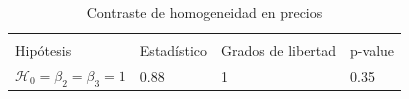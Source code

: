 \documentclass[12pt, twoside]{book}\usepackage[]{graphicx}\usepackage[]{color}
\numberwithin{equation}{section}
\numberwithin{theorem}{section}
\numberwithin{teorema}{section}
\numberwithin{defi}{section}
\numberwithin{prop}{section}
\numberwithin{defi}{section}
\theoremstyle{plain}
\begin{document}
\begin{table}[!htpb]
\centering
\begin{threeparttable}
\caption{Contraste de homogeneidad en precios \label{blrtest}}
\begin{tabular}{@{}llll@{}}
\toprule \\
Hipótesis & Estadístico & Grados de libertad & p-value \\
\midrule 
$\mathcal{H}_{0}=\beta_{2}=\beta_{3}=1$ & 0.88 & 1 & 0.35
\\
\bottomrule
\end{tabular}
\end{threeparttable}
\end{table}
\end{document}

